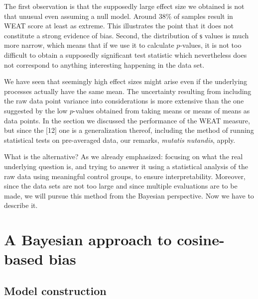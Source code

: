 \documentclass[
  12pt,
  dvipsnames,enabledeprecatedfontcommands]{scrartcl}
\begin{document}
The first observation is that the supposedly large effect size we
obtained is not that unusual even assuming a null model. Around 38\% of
samples result in \textsf{WEAT} score at least as extreme. This
illustrates the point that it does not constitute a strong evidence of
bias. Second, the distribution of \(\textsf{s}\) values is much more
narrow, which means that if we use it to calculate \(p\)-values, it is
not too difficult to obtain a supposedly significant test statistic
which nevertheless does not correspond to anything interesting happening
in the data set.

We have seen that seemingly high effect sizes might arise even if the
underlying processes actually have the same mean. The uncertainty
resulting from including the raw data point variance into considerations
is more extensive than the one suggested by the low \(p\)-values
obtained from taking means or means of means as data points. In the
section we discussed the performance of the \textsf{WEAT} measure, but
since the {[}12{]} one is a generalization thereof, including the method
of running statistical tests on pre-averaged data, our remarks,
\emph{mutatis nutandis}, apply.

What is the alternative? As we already emphasized: focusing on what the
real underlying question is, and trying to answer it using a statistical
analysis of the raw data using meaningful control groups, to ensure
interpretability. Moreover, since the data sets are not too large and
since multiple evaluations are to be made, we will pursue this method
from the Bayesian perspective. Now we have to describe it.

\hypertarget{a-bayesian-approach-to-cosine-based-bias}{%
\section{A Bayesian approach to cosine-based
bias}\label{a-bayesian-approach-to-cosine-based-bias}}

\label{sec:bayesian}

\hypertarget{model-construction}{%
\subsection{Model construction}\label{model-construction}}

\label{subsec:model}
\end{document}
